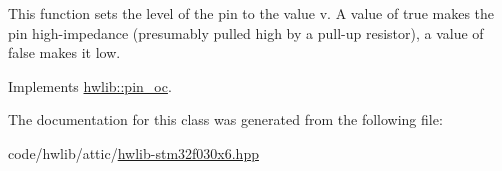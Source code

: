 This function sets the level of the pin to the value v. A value of true makes the pin high-\/impedance (presumably pulled high by a pull-\/up resistor), a value of false makes it low. 

Implements \hyperlink{classhwlib_1_1pin__oc_a4429dd7dc80858a213bb157f4ac5def3}{hwlib\+::pin\+\_\+oc}.



The documentation for this class was generated from the following file\+:\begin{DoxyCompactItemize}
\item 
code/hwlib/attic/\hyperlink{hwlib-stm32f030x6_8hpp}{hwlib-\/stm32f030x6.\+hpp}\end{DoxyCompactItemize}
